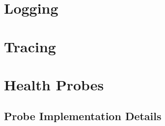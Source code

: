 \documentclass[a4paper,twoside]{sapthesis}
\begin{document}
\section{Logging}
\label{sec:logging}

\section{Tracing}
\label{sec:tracing}

\section{Health Probes}
\label{sec:health-probes}

\subsection{Probe Implementation Details}
%
%
%
%
%
%
\end{document}
